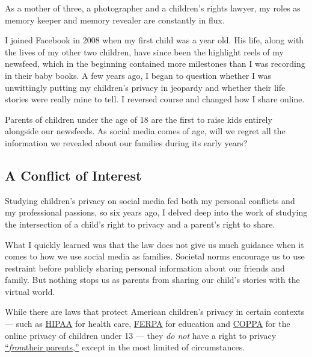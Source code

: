 As a mother of three, a photographer and a children's rights lawyer, my
roles as memory keeper and memory revealer are constantly in flux.

I joined Facebook in 2008 when my first child was a year old. His life,
along with the lives of my other two children, have since been the
highlight reels of my newsfeed, which in the beginning contained more
milestones than I was recording in their baby books. A few years ago, I
began to question whether I was unwittingly putting my children's
privacy in jeopardy and whether their life stories were really mine to
tell. I reversed course and changed how I share online.

Parents of children under the age of 18 are the first to raise kids
entirely alongside our newsfeeds. As social media comes of age, will we
regret all the information we revealed about our families during its
early years?

\hypertarget{a-conflict-of-interest}{%
\subsection{A Conflict of Interest}\label{a-conflict-of-interest}}

Studying children's privacy on social media fed both my personal
conflicts and my professional passions, so six years ago, I delved deep
into the work of studying the intersection of a child's right to privacy
and a parent's right to share.

What I quickly learned was that the law does not give us much guidance
when it comes to how we use social media as families. Societal norms
encour­age us to use restraint before publicly sharing personal
informa­tion about our friends and family. But nothing stops us as
parents from sharing our child's stories with the virtual world.

While there are laws that protect American children's privacy in certain
contexts --- such as \href{https://www.hhs.gov/hipaa/index.html}{HIPAA}
for health care,
\href{https://www2.ed.gov/policy/gen/guid/fpco/ferpa/index.html}{FERPA}
for education and
\href{https://www.ftc.gov/enforcement/rules/rulemaking-regulatory-reform-proceedings/childrens-online-privacy-protection-rule}{COPPA}
for the online privacy of children under 13 --- they \emph{do not} have
a right to privacy
\href{https://papers.ssrn.com/sol3/papers.cfm?abstract_id=1746540}{``}\href{https://papers.ssrn.com/sol3/papers.cfm?abstract_id=1746540}{\emph{from}}\href{https://papers.ssrn.com/sol3/papers.cfm?abstract_id=1746540}{their
parents,''} except in the most limited of circumstances.

